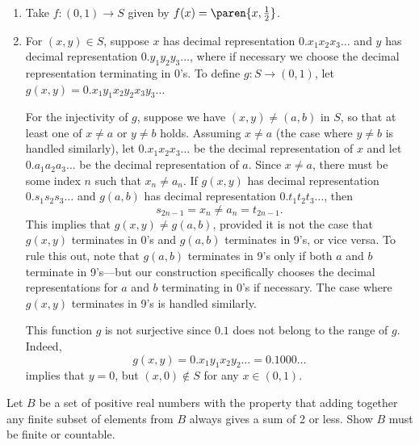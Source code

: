 \documentclass{lew98_solutions}
\begin{document}
\begin{solution}
    \begin{enumerate}
        \item Take \( f : (0, 1) \to S \) given by \( f(x) = \paren{x, \tfrac{1}{2}} \).

        \item For \( (x, y) \in S \), suppose \( x \) has decimal representation \( 0.x_1 x_2 x_3 \ldots \) and \( y \) has decimal representation \( 0.y_1 y_2 y_3 \ldots  \), where if necessary we choose the decimal representation terminating in 0's. To define \( g : S \to (0, 1) \), let \( g(x, y) = 0.x_1 y_1 x_2 y_2 x_3 y_3 \ldots \)
        
        For the injectivity of \( g \), suppose we have \( (x, y) \neq (a, b) \) in \( S \), so that at least one of \( x \neq a \) or \( y \neq b \) holds. Assuming \( x \neq a \) (the case where \( y \neq b \) is handled similarly), let \( 0.x_1 x_2 x_3 \ldots \) be the decimal representation of \( x \) and let \( 0.a_1 a_2 a_3 \ldots \) be the decimal representation of \( a \). Since \( x \neq a \), there must be some index \( n \) such that \( x_n \neq a_n \). If \( g(x, y) \) has decimal representation \( 0.s_1 s_2 s_3 \ldots \) and \( g(a, b) \) has decimal representation \( 0.t_1 t_2 t_3 \ldots \), then
        \[
            s_{2n - 1} = x_n \neq a_n = t_{2n - 1}.
        \]
        This implies that \( g(x, y) \neq g(a, b) \), provided it is not the case that \( g(x, y) \) terminates in 0's and \( g(a, b) \) terminates in 9's, or vice versa. To rule this out, note that \( g(a, b) \) terminates in 9's only if both \( a \) and \( b \) terminate in 9's---but our construction specifically chooses the decimal representations for \( a \) and \( b \) terminating in 0's if necessary. The case where \( g(x, y) \) terminates in 9's is handled similarly.

        This function \( g \) is not surjective since \( 0.1 \) does not belong to the range of \( g \). Indeed,
        \[
            g(x, y) = 0.x_1 y_1 x_2 y_2 \ldots = 0.1000 \ldots
        \]
        implies that \( y = 0 \), but \( (x, 0) \not\in S \) for any \( x \in (0, 1) \).
    \end{enumerate}
\end{solution}

\begin{exercise}
\label{ex:1.5.8}
    Let \( B \) be a set of positive real numbers with the property that adding together any finite subset of elements from \( B \) always gives a sum of 2 or less. Show \( B \) must be finite or countable.
\end{exercise}
\end{document}
